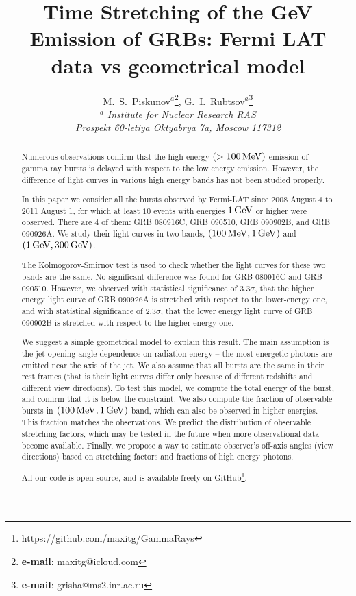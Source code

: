 \documentclass[11pt,a4paper]{article}
\begin{document}
\title{\bf Time Stretching of the GeV Emission of GRBs: Fermi LAT data vs geometrical model}
\author{M.~S.~Piskunov$^a$\footnote{{\bf e-mail}: maxitg@icloud.com},
G.~I.~Rubtsov$^{a}$\footnote{{\bf e-mail}: grisha@ms2.inr.ac.ru}
\\
$^a$ \small{\em Institute for Nuclear Research RAS} \\
\small{\em Prospekt 60-letiya Oktyabrya 7a, Moscow 117312}
}
\date{}
\maketitle

\begin{abstract}
Numerous observations confirm that the high energy $(> \unit[100]{MeV})$ emission of gamma ray bursts is delayed with respect to the low energy emission.
However, the difference of light curves in various high energy bands has not been studied properly.

In this paper we consider all the bursts observed by Fermi-LAT since 2008 August 4 to 2011 August 1, for which at least $10$ events with energies $\unit[1]{GeV}$ or higher were observed.
There are $4$ of them: GRB 080916C, GRB 090510, GRB 090902B, and GRB 090926A.
We study their light curves in two bands, $(\unit[100]{MeV}, \unit[1]{GeV})$ and $(\unit[1]{GeV}, \unit[300]{GeV})$.

The Kolmogorov-Smirnov test is used to check whether the light curves for these two bands are the same.
No significant difference was found for GRB 080916C and GRB 090510.
However, we observed with statistical significance of $3.3 \sigma$, that the higher energy light curve of GRB 090926A is stretched with respect to the lower-energy one, and with statistical significance of $2.3 \sigma$, that the lower energy light curve of GRB 090902B is stretched with respect to the higher-energy one.

We suggest a simple geometrical model to explain this result.
The main assumption is the jet opening angle dependence on radiation energy -- the most energetic photons are emitted near the axis of the jet.
We also assume that all bursts are the same in their rest frames (that is their light curves differ only because of different redshifts and different view directions).
To test this model, we compute the total energy of the burst, and confirm that it is below the constraint.
We also compute the fraction of observable bursts in $(\unit[100]{MeV}, \unit[1]{GeV})$ band, which can also be observed in higher energies.
This fraction matches the observations.
We predict the distribution of observable stretching factors, which may be tested in the future when more observational data become available.
Finally, we propose a way to estimate observer's off-axis angles (view directions) based on stretching factors and fractions of high energy photons.

All our code is open source, and is available freely on GitHub\footnote{\url{https://github.com/maxitg/GammaRays}}.
\end{abstract}
\end{document}
